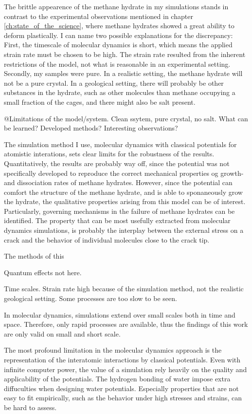 The brittle appearence of the methane hydrate in my simulations stands in contrast to the experimental observations mentioned in chapter \ref{ch:state_of_the_science}, where methane hydrates showed a great ability to deform plastically. I can name two possible explanations for the discrepancy: First, the timescale of molecular dynamics is short, which means the applied strain rate must be chosen to be high. The strain rate  resulted from the inherent restrictions of the model, not what is reasonable in an experimental setting. Secondly, my samples were pure. In a realistic setting, the methane hydrate will not be a pure crystal. In a geological setting, there will probably be other substances in the hydrate, such as other molecules than methane occupying a small fraction of the cages, and there might also be salt present.

@Limitations of the model/system. Clean ssytem, pure crystal, no salt. What can be learned? Developed methods? Interesting observations? 

The simulation method I use, molecular dynamics with classical potentials for atomistic interations, sets clear limits for the robustness of the results. Quantitatively, the results are probably way off, since the potential was not specifically developed to reproduce the correct mechanical properties og growth- and dissociation rates of methane hydrates. However, since the potential can comfort the structure of the methane hydrate, and is able to sponaneously grow the hydrate, the qualitative properties arising from this model can be of interest. Particularly, governing mechanisms in the failure of methane hydrates can be identified. The property that can be most usefully extracted from molecular dynamics simulations, is probably the interplay between the external stress on a crack and the behavior of individual molecules close to the crack tip. 

The methods of this

Quantum effects not here.

Time scales. Strain rate high because of the simulation method, not the realistic geological setting. Some processes are too slow to be seen. 

In molecular dynamics, simulations extend over small scales both in time and space. Therefore, only rapid processes are available, thus the findings of this work are only valid on small and short scale.

The most profound limitation in the molecular dynamics approach is the representation of the interatomic interactions by classical potentials. Even with infinite computer power, the value of a simulation rely heavily on the quality and applicability of the potentials. The hydrogen bonding of water impose extra diffuculties when designing water potentials. Especially properties that are not easy to fit empirically, such as the behavior under high stresses and strains, can be hard to assess.

